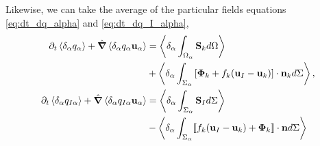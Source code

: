Likewise, we can take the average of the particular fields equations \ref{eq:dt_dq_alpha} and \ref{eq:dt_dq_I_alpha}, 
\begin{align}
    \partial_t \left<\delta_\alpha  q_\alpha\right>
    + \hat{\bm{\nabla}} \left<\delta_\alpha  q_\alpha \textbf{u}_\alpha\right>
    &= \left<\delta_\alpha \int_{\Omega_\alpha} \textbf{S}_k d\Omega\right>\nonumber\\
    &+ \left<\delta_\alpha \int_{\Sigma_\alpha} \left[\bm{\Phi}_k + f_k (\textbf{u}_I-\textbf{u}_k) \right] \cdot \textbf{n}_k d\Sigma\right>,
    \label{eq:avg_dt_dq_alpha}\\
    \partial_t \left<\delta_\alpha  q_{I\alpha}\right>
    + \hat{\bm{\nabla}} \left<\delta_\alpha  q_{I\alpha} \textbf{u}_\alpha\right>
    &= \left<\delta_\alpha \int_{\Sigma_\alpha} 
        \textbf{S}_I
    d\Sigma\right>\nonumber\\
    &- \left<\delta_\alpha \int_{\Sigma_\alpha} \llbracket 
        f_k (\textbf{u}_I - \textbf{u}_k)
        + \mathbf{\Phi}_k
     \rrbracket \cdot \textbf{n}
    d\Sigma\right>
    \label{eq:avg_dt_dq_I_alpha}
\end{align}
